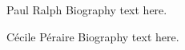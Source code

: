 \begin{IEEEbiography}{Paul Ralph}
Biography text here.
\end{IEEEbiography}

\begin{IEEEbiography}{C\'ecile P\'eraire}
Biography text here.
\end{IEEEbiography}


























































